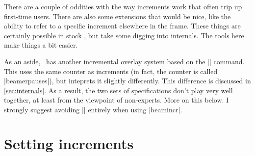 \documentclass[a4paper]{ltxdoc}
\begin{document}
There are a couple of oddities with the way increments work that often trip up
first-time users.  There are also some extensions that would be nice, like the
ability to refer to a specific increment elsewhere in the frame.  These things
are certainly possible in stock \beamer, but take some digging into internals.
The tools here make things a bit easier.

As an aside, \beamer\ has another incremental overlay system based on the
|\pause| command.  This uses the same counter as increments (in fact, the
counter is called |beamerpauses|), but inteprets it slightly differently. This
difference is discussed in \cref{sec:internals}. As a result, the two sets of
specifications don't play very well together, at least from the viewpoint of
non-experts.  More on this below.  I strongly suggest avoiding
|\pause| entirely when using |beamincr|.


\section{Setting increments}\label{sec:setting}
\end{document}
